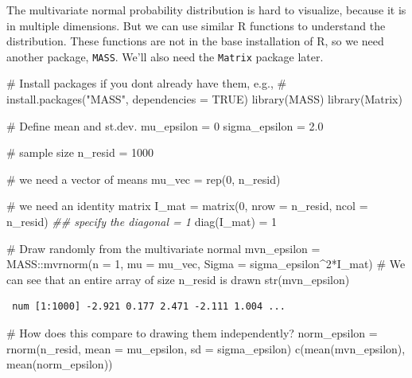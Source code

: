 \documentclass[
  letterpaper,
  DIV=11,
  numbers=noendperiod]{scrreprt}
\newenvironment{Shaded}{\begin{snugshade}}{\end{snugshade}}
\newcommand{\AttributeTok}[1]{\textcolor[rgb]{0.40,0.45,0.13}{#1}}
\newcommand{\CommentTok}[1]{\textcolor[rgb]{0.37,0.37,0.37}{#1}}
\newcommand{\DecValTok}[1]{\textcolor[rgb]{0.68,0.00,0.00}{#1}}
\newcommand{\DocumentationTok}[1]{\textcolor[rgb]{0.37,0.37,0.37}{\textit{#1}}}
\newcommand{\FloatTok}[1]{\textcolor[rgb]{0.68,0.00,0.00}{#1}}
\newcommand{\FunctionTok}[1]{\textcolor[rgb]{0.28,0.35,0.67}{#1}}
\newcommand{\NormalTok}[1]{\textcolor[rgb]{0.00,0.23,0.31}{#1}}
\newcommand{\OtherTok}[1]{\textcolor[rgb]{0.00,0.23,0.31}{#1}}
\newcommand{\SpecialCharTok}[1]{\textcolor[rgb]{0.37,0.37,0.37}{#1}}
\begin{document}
The multivariate normal probability distribution is hard to visualize,
because it is in multiple dimensions. But we can use similar R functions
to understand the distribution. These functions are not in the base
installation of R, so we need another package, \texttt{MASS}. We'll also
need the \texttt{Matrix} package later.

\begin{Shaded}
\begin{Highlighting}[]
\CommentTok{\# Install packages if you don\textquotesingle{}t already have them, e.g., }
\CommentTok{\# install.packages("MASS", dependencies = TRUE)}
\FunctionTok{library}\NormalTok{(MASS)}
\FunctionTok{library}\NormalTok{(Matrix)}

\CommentTok{\# Define mean and st.dev.}
\NormalTok{mu\_epsilon }\OtherTok{=} \DecValTok{0}
\NormalTok{sigma\_epsilon }\OtherTok{=} \FloatTok{2.0}

\CommentTok{\# sample size}
\NormalTok{n\_resid }\OtherTok{=} \DecValTok{1000}

\CommentTok{\# we need a vector of means}
\NormalTok{mu\_vec }\OtherTok{=} \FunctionTok{rep}\NormalTok{(}\DecValTok{0}\NormalTok{, n\_resid)}

\CommentTok{\# we need an identity matrix}
\NormalTok{I\_mat }\OtherTok{=} \FunctionTok{matrix}\NormalTok{(}\DecValTok{0}\NormalTok{, }\AttributeTok{nrow =}\NormalTok{ n\_resid, }\AttributeTok{ncol =}\NormalTok{ n\_resid)}
\DocumentationTok{\#\# specify the diagonal = 1}
\FunctionTok{diag}\NormalTok{(I\_mat) }\OtherTok{=} \DecValTok{1}

\CommentTok{\# Draw randomly from the multivariate normal}
\NormalTok{mvn\_epsilon }\OtherTok{=}\NormalTok{ MASS}\SpecialCharTok{::}\FunctionTok{mvrnorm}\NormalTok{(}\AttributeTok{n =} \DecValTok{1}\NormalTok{, }
                            \AttributeTok{mu =}\NormalTok{ mu\_vec,}
                            \AttributeTok{Sigma =}\NormalTok{ sigma\_epsilon}\SpecialCharTok{\^{}}\DecValTok{2}\SpecialCharTok{*}\NormalTok{I\_mat)}
\CommentTok{\# We can see that an entire array of size n\_resid is drawn}
\FunctionTok{str}\NormalTok{(mvn\_epsilon)}
\end{Highlighting}
\end{Shaded}

\begin{verbatim}
 num [1:1000] -2.921 0.177 2.471 -2.111 1.004 ...
\end{verbatim}

\begin{Shaded}
\begin{Highlighting}[]
\CommentTok{\# How does this compare to drawing them independently?}
\NormalTok{norm\_epsilon }\OtherTok{=} \FunctionTok{rnorm}\NormalTok{(n\_resid, }\AttributeTok{mean =}\NormalTok{ mu\_epsilon, }\AttributeTok{sd =}\NormalTok{ sigma\_epsilon)}
\FunctionTok{c}\NormalTok{(}\FunctionTok{mean}\NormalTok{(mvn\_epsilon), }\FunctionTok{mean}\NormalTok{(norm\_epsilon))}
\end{Highlighting}
\end{Shaded}
\end{document}
